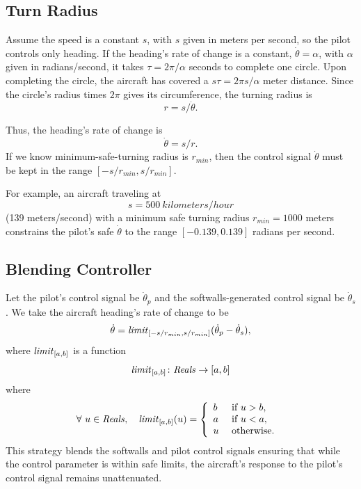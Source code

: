 \documentclass[11pt]{article}
\begin{document}
\subsection{Turn Radius}

Assume the speed is a constant $s$, with $s$ given in meters per
second, so the pilot controls only heading.  If the heading's rate of
change is a constant, $\dot{\theta} = \alpha$, with $\alpha$ given in
radians/second, it takes $\tau = 2 \pi /\alpha$ seconds to complete
one circle.  Upon completing the circle, the aircraft has covered a
$s\tau = 2 \pi s/\alpha$ meter distance.  Since the circle's radius
times $2 \pi$ gives its circumference, the turning radius is
\[
r = s/\dot{\theta} .
\]

Thus, the heading's rate of change is
\[
\dot{\theta} = s/r.
\]
If we know minimum-safe-turning radius is $r_{min}$, then the control
signal $\dot{\theta}$ must be kept in the range $[-s/r_{min},
s/r_{min}]$.

For example, an aircraft traveling at
\[
s = 500~ kilometers/hour
\]
(139 meters/second) with a minimum safe turning radius $r_{min} =
1000$ meters constrains the pilot's safe $\dot{\theta}$ to the range
$[-0.139, 0.139]$ radians per second.


\subsection{Blending Controller}

Let the pilot's control signal be $\dot{\theta}_p$ and the
softwalls-generated control signal be $\dot{\theta}_s$.  We take the
aircraft heading's rate of change to be
\[
\dot{\theta} = \mbox{\textit{limit}}_{[-s/r_{min}, s/r_{min}]}
(\dot{\theta}_p - \dot{\theta}_s ),
\]
where $\mbox{\textit{limit}}_{[a,b]}$ is a function
\[
\mbox{\textit{limit}}_{[a,b]} \colon \mbox{\textit{Reals}} \to [a, b]
\]
where
\[
\forall ~ u \in \mbox{\textit{Reals}}, \quad
\mbox{\textit{limit}}_{[a,b]}(u) = \left \{
\begin{array}{ll}
b&\mbox{ if } u > b,\\
a&\mbox{ if } u < a,\\
u&\mbox{ otherwise. }
\end{array}
\right .
\]
This strategy blends the softwalls and pilot control signals ensuring
that while the control parameter is within safe limits, the aircraft's
response to the pilot's control signal remains unattenuated.

\end{document}
